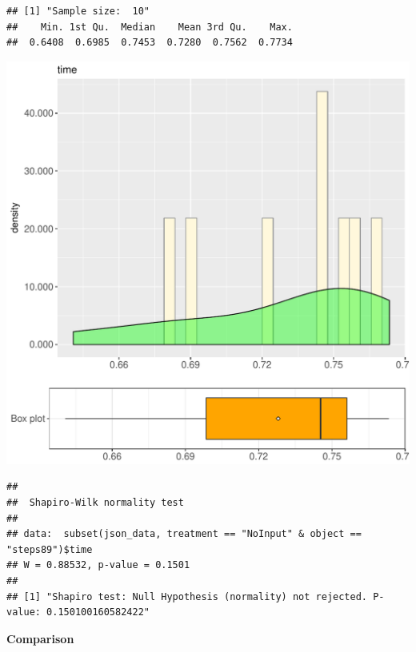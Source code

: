 \documentclass{article}\usepackage[]{graphicx}\usepackage[]{color}
\makeatletter
\def\maxwidth{ %
  \ifdim\Gin@nat@width>\linewidth
    \linewidth
  \else
    \Gin@nat@width
  \fi
}
\newenvironment{kframe}{%
 \def\at@end@of@kframe{}%
 \ifinner\ifhmode%
  \def\at@end@of@kframe{\end{minipage}}%
  \begin{minipage}{\columnwidth}%
 \fi\fi%
 \def\FrameCommand##1{\hskip\@totalleftmargin \hskip-\fboxsep
 \colorbox{shadecolor}{##1}\hskip-\fboxsep
     \hskip-\linewidth \hskip-\@totalleftmargin \hskip\columnwidth}%
 \MakeFramed {\advance\hsize-\width
   \@totalleftmargin\z@ \linewidth\hsize
   \@setminipage}}%
 {\par\unskip\endMakeFramed%
 \at@end@of@kframe}
\newenvironment{knitrout}{}{} %
\makeatother
\begin{document}
\begin{knitrout}
\color{fgcolor}\begin{kframe}
\begin{verbatim}
## [1] "Sample size:  10"
##    Min. 1st Qu.  Median    Mean 3rd Qu.    Max. 
##  0.6408  0.6985  0.7453  0.7280  0.7562  0.7734
\end{verbatim}
\end{kframe}
\includegraphics[width=\maxwidth]{figure/RH4_NoInput_steps89-1} 
\begin{kframe}\begin{verbatim}
## 
## 	Shapiro-Wilk normality test
## 
## data:  subset(json_data, treatment == "NoInput" & object == "steps89")$time
## W = 0.88532, p-value = 0.1501
## 
## [1] "Shapiro test: Null Hypothesis (normality) not rejected. P-value: 0.150100160582422"
\end{verbatim}
\end{kframe}
\end{knitrout}
  
 \textbf{Comparison}
  
\end{document}
